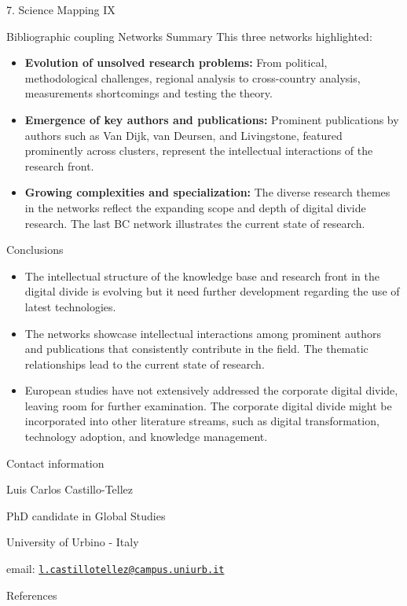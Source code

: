 \documentclass[
  ignorenonframetext,
]{beamer}
\newif\ifbibliography
\begin{document}
\begin{frame}{7. Science Mapping IX}
\protect\hypertarget{science-mapping-ix}{}
\begin{block}{Bibliographic coupling Networks Summary}
\protect\hypertarget{bibliographic-coupling-networks-summary}{}
This three networks highlighted:

\begin{itemize}
\item
  \textbf{Evolution of unsolved research problems:} From political,
  methodological challenges, regional analysis to cross-country
  analysis, measurements shortcomings and testing the theory.
\item
  \textbf{Emergence of key authors and publications:} Prominent
  publications by authors such as Van Dijk, van Deursen, and
  Livingstone, featured prominently across clusters, represent the
  intellectual interactions of the research front.
\item
  \textbf{Growing complexities and specialization:} The diverse research
  themes in the networks reflect the expanding scope and depth of
  digital divide research. The last BC network illustrates the current
  state of research.
\end{itemize}
\end{block}
\end{frame}

\begin{frame}{Conclusions}
\protect\hypertarget{conclusions}{}
\begin{itemize}
\item
  The intellectual structure of the knowledge base and research front in
  the digital divide is evolving but it need further development
  regarding the use of latest technologies.
\item
  The networks showcase intellectual interactions among prominent
  authors and publications that consistently contribute in the field.
  The thematic relationships lead to the current state of research.
\item
  European studies have not extensively addressed the corporate digital
  divide, leaving room for further examination. The corporate digital
  divide might be incorporated into other literature streams, such as
  digital transformation, technology adoption, and knowledge management.
\end{itemize}
\end{frame}

\begin{frame}{Contact information}
\protect\hypertarget{contact-information}{}
\vspace{2cm}

Luis Carlos Castillo-Tellez

\vspace{0.1cm}

PhD candidate in Global Studies

University of Urbino - Italy

email:
\href{mailto:l.castillotellez@campus.uniurb.it}{\nolinkurl{l.castillotellez@campus.uniurb.it}}
\end{frame}

\renewcommand\refname{References}
\begin{frame}[allowframebreaks]{References}
  \bibliographytrue
  
\end{frame}
\end{document}

